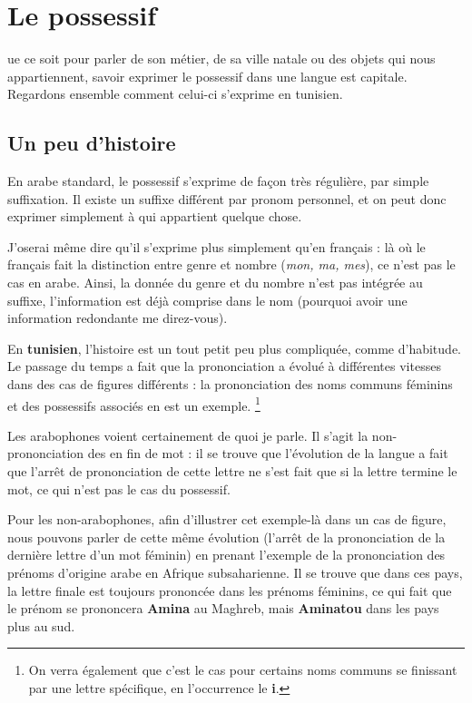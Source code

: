 \chapter{Le possessif}\label{Possessif}
ue ce soit pour parler de son métier, de sa ville natale ou des objets qui nous appartiennent, savoir exprimer le possessif dans une langue est capitale. Regardons ensemble comment celui-ci s'exprime en tunisien.

\section{Un peu d'histoire}
En arabe standard, le possessif s'exprime de façon très régulière, par simple suffixation. Il existe un suffixe différent par pronom personnel, et on peut donc exprimer simplement à qui appartient quelque chose. 

J'oserai même dire qu'il s'exprime plus simplement qu'en français : là où le français fait la distinction entre genre et nombre (\textit{mon, ma, mes}), ce n'est pas le cas en arabe. Ainsi, la donnée du genre et du nombre n'est pas intégrée au suffixe, l'information est déjà comprise dans le nom (pourquoi avoir une information redondante me direz-vous).

En \textbf{tunisien}, l'histoire est un tout petit peu plus compliquée, comme  d'habitude. Le passage du temps a fait que la prononciation a évolué à différentes vitesses dans des cas de figures différents : la prononciation des noms communs féminins et des possessifs associés en est un exemple. \footnote{On verra également que c'est le cas pour certains noms communs se finissant par une lettre spécifique, en l'occurrence le \textbf{i}.}

Les arabophones voient certainement de quoi je parle. Il s'agit la non-prononciation des  en fin de mot : il se trouve que l'évolution de la langue a fait que l'arrêt de prononciation de cette lettre ne s'est fait que si la lettre termine le mot, ce qui n'est pas le cas du possessif. 

Pour les non-arabophones, afin d'illustrer cet exemple-là dans un cas de figure, nous pouvons parler de cette même évolution (l'arrêt de la prononciation de la dernière lettre d'un mot féminin) en prenant l'exemple de la prononciation des prénoms d'origine arabe en Afrique subsaharienne. Il se trouve que dans ces pays, la lettre finale est toujours prononcée dans les prénoms féminins, ce qui fait que le prénom  se prononcera \textbf{Amina} au Maghreb, mais \textbf{Aminatou} dans les pays plus au sud.

